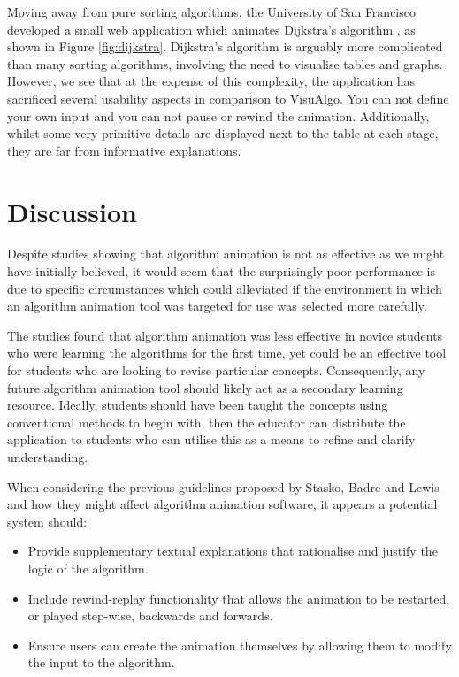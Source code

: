 \documentclass{l4proj}
\begin{document}
Moving away from pure sorting algorithms, the University of San Francisco developed a small web application which animates Dijkstra's algorithm \cite{dijkstra}, as shown in Figure \ref{fig:dijkstra}. Dijkstra's algorithm is arguably more complicated than many sorting algorithms, involving the need to visualise tables and graphs. However, we see that at the expense of this complexity, the application has sacrificed several usability aspects in comparison to VisuAlgo. You can not define your own input and you can not pause or rewind the animation. Additionally, whilst some very primitive details are displayed next to the table at each stage, they are far from informative explanations. 

\section{Discussion}
Despite studies showing that algorithm animation is not as effective as we might have initially believed, it would seem that the surprisingly poor performance is due to specific circumstances which could alleviated if the environment in which an algorithm animation tool was targeted for use was selected more carefully. 

The studies found that algorithm animation was less effective in novice students who were learning the algorithms for the first time, yet could be an effective tool for students who are looking to revise particular concepts. Consequently, any future algorithm animation tool should likely act as a secondary learning resource. Ideally, students should have been taught the concepts using conventional methods to begin with, then the educator can distribute the application to students who can utilise this as a means to refine and clarify understanding.

When considering the previous guidelines proposed by Stasko, Badre and Lewis and how they might affect algorithm animation software, it appears a potential system should:
\begin{itemize}
\item Provide supplementary textual explanations that rationalise and justify the logic of the algorithm.
\item Include rewind-replay functionality that allows the animation to be restarted, or played step-wise, backwards and forwards.
\item Ensure users can create the animation themselves by allowing them to modify the input to the algorithm.
\end{itemize}
\end{document}
